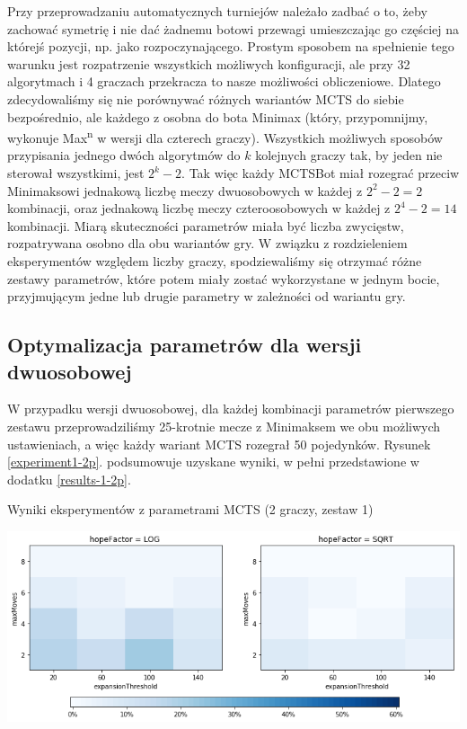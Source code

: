 \documentclass{pracamgr}
\begin{document}
Przy przeprowadzaniu automatycznych turniejów należało zadbać o to, żeby zachować symetrię i nie dać żadnemu botowi przewagi umieszczając go częściej na którejś pozycji, np. jako rozpoczynającego.
Prostym sposobem na spełnienie tego warunku jest rozpatrzenie wszystkich możliwych konfiguracji, ale przy 32 algorytmach i 4 graczach przekracza to nasze możliwości obliczeniowe.
Dlatego zdecydowaliśmy się nie porównywać różnych wariantów MCTS do siebie bezpośrednio, ale każdego z osobna do bota Minimax (który, przypomnijmy, wykonuje Max\textsuperscript{n} w wersji dla czterech graczy).
Wszystkich możliwych sposobów przypisania jednego dwóch algorytmów do \(k\) kolejnych graczy tak, by jeden nie sterował wszystkimi, jest \(2^k - 2\).
Tak więc każdy MCTSBot miał rozegrać przeciw Minimaksowi jednakową liczbę meczy dwuosobowych w każdej z \(2^2 -2 = 2\) kombinacji, oraz jednakową liczbę meczy czteroosobowych w każdej z \(2^4 - 2 = 14\) kombinacji.
Miarą skuteczności parametrów miała być liczba zwycięstw, rozpatrywana osobno dla obu wariantów gry.
W związku z rozdzieleniem eksperymentów względem liczby graczy, spodziewaliśmy się otrzymać różne zestawy parametrów, które potem miały zostać wykorzystane w jednym bocie, przyjmującym jedne lub drugie parametry w zależności od wariantu gry.

\subsection{Optymalizacja parametrów dla wersji dwuosobowej}

W przypadku wersji dwuosobowej, dla każdej kombinacji parametrów pierwszego zestawu przeprowadziliśmy 25-krotnie mecze z Minimaksem we obu możliwych ustawieniach, a więc każdy wariant MCTS rozegrał 50 pojedynków.
Rysunek \ref{experiment1-2p}. podsumowuje uzyskane wyniki, w pełni przedstawione w dodatku \ref{results-1-2p}.

\begin{rysunek}
\caption{Wyniki eksperymentów z parametrami MCTS (2 graczy, zestaw 1) \label{experiment1-2p}}
\centering
\includegraphics[width=160mm]{experiment1-2p.png}
\end{rysunek}
\end{document}
